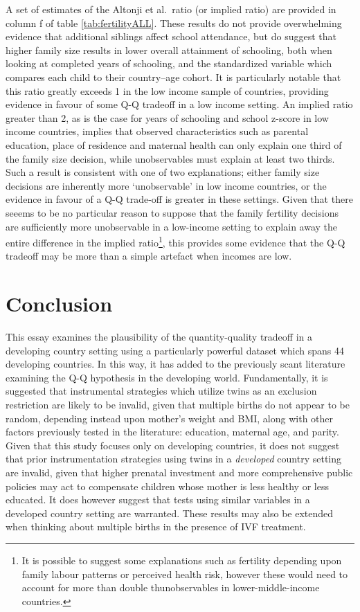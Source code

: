 \documentclass{article}[11pt,subeqn]
\begin{document}
\begin{spacing}{1.5}
A set of estimates of the Altonji et al.\ ratio (or implied ratio) are provided in column f of table \ref{tab:fertilityALL}.  These results do not provide overwhelming evidence
that additional siblings affect school attendance, but do suggest that higher family size results in lower overall attainment of schooling, both when looking at completed years of schooling, and the standardized variable which compares each child to their country--age cohort.  It is particularly notable that this ratio greatly exceeds 1 in the low income sample of
countries, providing evidence in favour of some Q-Q tradeoff in a low income setting.  An implied ratio greater than 2, as is the case for years of schooling and school z-score in low income countries, implies that observed characteristics such as parental education, place of residence and maternal health can only explain one third of the family size decision, while unobservables must explain at least two thirds.  Such a result is consistent with one of two explanations; either family size decisions are inherently more `unobservable' in low income countries, or the evidence in favour of a Q-Q trade-off is greater in these settings.  Given that there seeems to be no particular reason to suppose that the family fertility decisions are sufficiently more unobservable in a low-income setting to explain away the entire difference in the implied ratio\footnote{It is possible to suggest some explanations such as fertility depending upon family labour patterns or perceived health risk, however these would need to account for more than double thunobservables in lower-middle-income countries.}, this provides some evidence that the Q-Q tradeoff may be more than a simple artefact when incomes are low. 

\section{Conclusion}
\label{scn:conclusion}
This essay examines the plausibility of the quantity-quality tradeoff in a developing country setting using a particularly powerful dataset which spans 44 developing countries.  In this way, it has added to the previously scant literature examining the Q-Q hypothesis in the developing world.  Fundamentally, it is suggested that instrumental strategies which utilize twins as an exclusion restriction are likely to be invalid, given that multiple births do not appear to be random, depending instead upon mother's weight and BMI, along with other factors previously tested in the literature: education, maternal age, and parity.  Given that this study focuses only on developing countries, it does not suggest that prior instrumentation strategies using twins in a \emph{developed} country setting are invalid, given that higher prenatal investment and more comprehensive public policies may act to compensate children whose mother is less healthy or less educated.  It does however suggest that tests using similar variables in a developed country setting are warranted.  These results may also  be extended when thinking about multiple births in the presence of IVF treatment.


\end{spacing}
\end{document}
